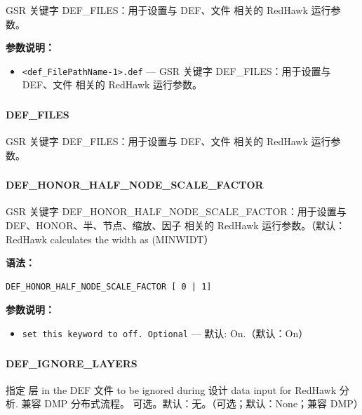 GSR 关键字 DEF_FILES：用于设置与 DEF、文件 相关的 RedHawk 运行参数。

\textbf{参数说明：}
\begin{itemize}
\item \texttt{<def\_FilePathName-1>.def} — GSR 关键字 DEF\_FILES：用于设置与 DEF、文件 相关的 RedHawk 运行参数。
\end{itemize}

\subsubsection{}
\paragraph*{DEF_FILES}

GSR 关键字 DEF_FILES：用于设置与 DEF、文件 相关的 RedHawk 运行参数。

\subsubsection{}
\paragraph*{DEF_HONOR_HALF_NODE_SCALE_FACTOR}

GSR 关键字 DEF_HONOR_HALF_NODE_SCALE_FACTOR：用于设置与 DEF、HONOR、半、节点、缩放、因子 相关的 RedHawk 运行参数。（默认：RedHawk calculates the width as (MINWIDT）

\textbf{语法：}
\begin{lstlisting}
DEF_HONOR_HALF_NODE_SCALE_FACTOR [ 0 | 1]
\end{lstlisting}

\textbf{参数说明：}
\begin{itemize}
\item \texttt{set this keyword to off. Optional} — 默认: On.（默认：On）
\end{itemize}

\subsubsection{}
\paragraph*{DEF_IGNORE_LAYERS}

指定 层 in the DEF 文件 to be ignored during 设计 data input for RedHawk 分析. 兼容 DMP 分布式流程。 可选。默认：无。（可选；默认：None；兼容 DMP）

